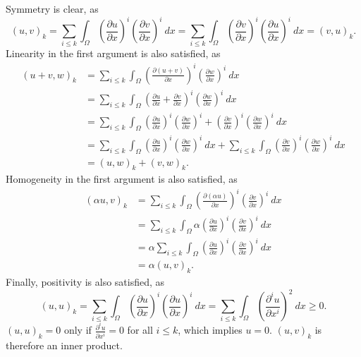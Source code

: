 \begin{solution}
    Symmetry is clear, as
    \begin{equation*}
        (u, v)_k
        = \sum_{i \leq k} \int_{\Omega} \left( \frac{\partial u}{\partial x} \right)^i \left( \frac{\partial v}{\partial x} \right)^i \ dx
        = \sum_{i \leq k} \int_{\Omega} \left( \frac{\partial v}{\partial x} \right)^i \left( \frac{\partial u}{\partial x} \right)^i \ dx
        = (v, u)_k.
    \end{equation*}
    Linearity in the first argument is also satisfied, as
    \begin{align*}
        (u + v, w)_k
        &= \sum_{i \leq k} \int_{\Omega} \left( \frac{\partial (u + v)}{\partial x} \right)^i \left( \frac{\partial w}{\partial x} \right)^i \ dx \\
        &= \sum_{i \leq k} \int_{\Omega} \left( \frac{\partial u}{\partial x} + \frac{\partial v}{\partial x} \right)^i \left( \frac{\partial w}{\partial x} \right)^i \ dx \\
        &= \sum_{i \leq k} \int_{\Omega} \left( \frac{\partial u}{\partial x} \right)^i \left( \frac{\partial w}{\partial x} \right)^i + \left( \frac{\partial v}{\partial x} \right)^i \left( \frac{\partial w}{\partial x} \right)^i \ dx \\
        &= \sum_{i \leq k} \int_{\Omega} \left( \frac{\partial u}{\partial x} \right)^i \left( \frac{\partial w}{\partial x} \right)^i \ dx + \sum_{i \leq k} \int_{\Omega} \left( \frac{\partial v}{\partial x} \right)^i \left( \frac{\partial w}{\partial x} \right)^i \ dx \\
        &= (u, w)_k + (v, w)_k.
    \end{align*}
    Homogeneity in the first argument is also satisfied, as
    \begin{align*}
        (\alpha u, v)_k
        &= \sum_{i \leq k} \int_{\Omega} \left( \frac{\partial (\alpha u)}{\partial x} \right)^i \left( \frac{\partial v}{\partial x} \right)^i \ dx \\
        &= \sum_{i \leq k} \int_{\Omega} \alpha \left( \frac{\partial u}{\partial x} \right)^i \left( \frac{\partial v}{\partial x} \right)^i \ dx \\
        &= \alpha \sum_{i \leq k} \int_{\Omega} \left( \frac{\partial u}{\partial x} \right)^i \left( \frac{\partial v}{\partial x} \right)^i \ dx \\
        &= \alpha (u, v)_k.
    \end{align*}
    Finally, positivity is also satisfied, as
    \begin{equation*}
        (u, u)_k
        = \sum_{i \leq k} \int_{\Omega} \left( \frac{\partial u}{\partial x} \right)^i \left( \frac{\partial u}{\partial x} \right)^i \ dx
        = \sum_{i \leq k} \int_{\Omega} \left( \frac{\partial^i u}{\partial x^i} \right)^{2} \ dx
        \geq 0.
    \end{equation*}
    $(u, u)_k = 0$ only if $\frac{\partial^i u}{\partial x^i} = 0$ for all $i \leq k$, which implies $u = 0$.
    $(u, v)_k$ is therefore an inner product.
\end{solution}

